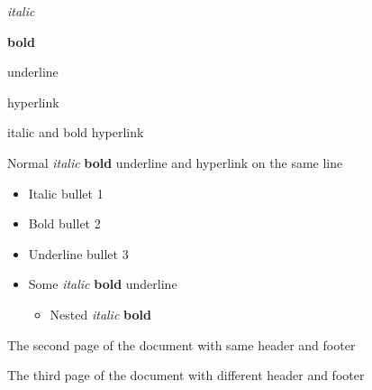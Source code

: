 \documentclass[11pt,a4paper]{article}
\begin{document}
\textit{italic}

\textbf{bold}

underline

hyperlink

italic and bold hyperlink

Normal \textit{italic} \textbf{bold} underline and
hyperlink
on the same line

\begin{itemize}
\item Italic bullet 1
\item Bold bullet 2
\item Underline bullet 3
\item Some \textit{italic} \textbf{bold} underline
  \begin{itemize}
\item Nested \textit{italic} \textbf{bold}
  \end{itemize}
\end{itemize}

The second page of the document with same header and footer

The third page of the document with different header and footer
\end{document}
